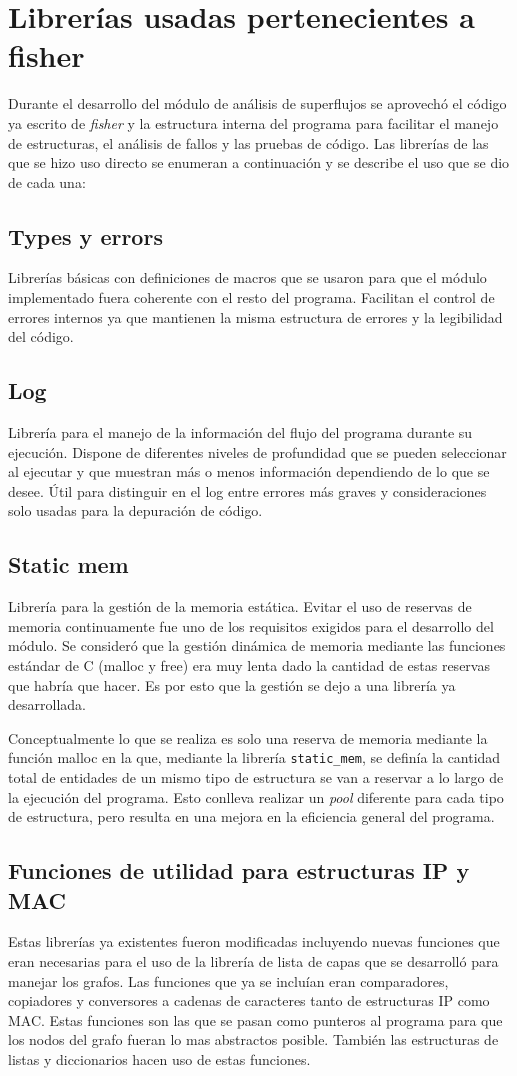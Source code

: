 \documentclass[twoside, 12pt]{epstfg}
\begin{document}
\section{Librerías usadas pertenecientes a fisher}
Durante el desarrollo del módulo de análisis de superflujos se aprovechó el código ya escrito de \textit{fisher} y la estructura interna del programa para facilitar el manejo de estructuras, el análisis de fallos y las pruebas de código. Las librerías de las que se hizo uso directo se enumeran a continuación y se describe el uso que se dio de cada una:
\subsection{Types y errors}
Librerías básicas con definiciones de macros que se usaron para que el módulo implementado fuera coherente con el resto del programa. Facilitan el control de errores internos ya que mantienen la misma estructura de errores y la legibilidad del código.
\subsection{Log} 
Librería para el manejo de la información del flujo del programa durante su ejecución. Dispone de diferentes niveles de profundidad que se pueden seleccionar al ejecutar y que muestran más o menos información dependiendo de lo que se desee. Útil para distinguir en el log entre errores más graves y consideraciones solo usadas para la depuración de código.
\subsection{Static mem}
Librería para la gestión de la memoria estática. Evitar el uso de reservas de memoria continuamente fue uno de los requisitos exigidos para el desarrollo del módulo. Se consideró que la gestión dinámica de memoria mediante las funciones estándar de C (malloc y free) era muy lenta dado la cantidad de estas reservas que habría que hacer. Es por esto que la gestión se dejo a una librería ya desarrollada. 

Conceptualmente lo que se realiza es solo una reserva de memoria mediante la función malloc en la que, mediante la librería \texttt{static\_mem}, se definía la cantidad total de entidades de un mismo tipo de estructura se van a reservar a lo largo de la ejecución del programa. Esto conlleva realizar un \textit{pool} diferente para cada tipo de estructura, pero resulta en una mejora en la eficiencia general del programa.
\subsection{Funciones de utilidad para estructuras IP y MAC}
Estas librerías ya existentes fueron modificadas incluyendo nuevas funciones que eran necesarias para el uso de la librería de lista de capas que se desarrolló para manejar los grafos. Las funciones que ya se incluían eran comparadores, copiadores y conversores a cadenas de caracteres tanto de estructuras IP como MAC. Estas funciones son las que se pasan como punteros al programa para que los nodos del grafo fueran lo mas abstractos posible. También las estructuras de listas y diccionarios hacen uso de estas funciones.
\end{document}
